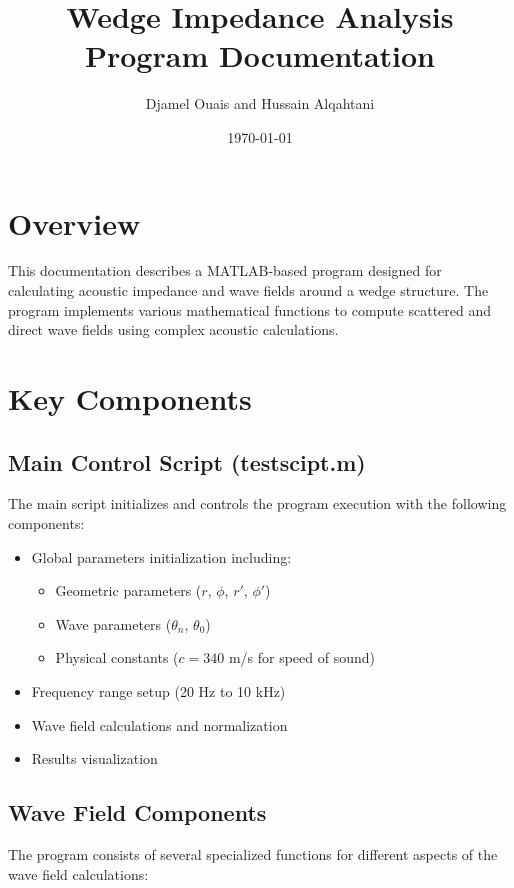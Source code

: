 \documentclass[12pt,a4paper]{article}
\title{Wedge Impedance Analysis Program Documentation}
\author{Djamel Ouais and Hussain Alqahtani}
\date{\today}
\begin{document}
\maketitle

\tableofcontents

\section{Overview}
This documentation describes a MATLAB-based program designed for calculating acoustic impedance and wave fields around a wedge structure. The program implements various mathematical functions to compute scattered and direct wave fields using complex acoustic calculations.

\section{Key Components}

\subsection{Main Control Script (testscipt.m)}
The main script initializes and controls the program execution with the following components:
\begin{itemize}
    \item Global parameters initialization including:
    \begin{itemize}
        \item Geometric parameters ($r$, $\phi$, $r'$, $\phi'$)
        \item Wave parameters ($\theta_n$, $\theta_0$)
        \item Physical constants ($c = 340$ m/s for speed of sound)
    \end{itemize}
    \item Frequency range setup (20 Hz to 10 kHz)
    \item Wave field calculations and normalization
    \item Results visualization
\end{itemize}

\subsection{Wave Field Components}
The program consists of several specialized functions for different aspects of the wave field calculations:
\end{document}
